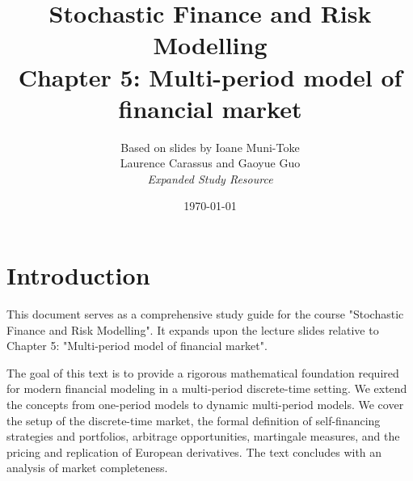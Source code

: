 \documentclass[12pt, a4paper]{report}
\title{\textbf{Stochastic Finance and Risk Modelling} \\ \large Chapter 5: Multi-period model of financial market}
\author{Based on slides by Ioane Muni-Toke \\ Laurence Carassus and Gaoyue Guo \\ \textit{Expanded Study Resource}}
\date{\today}
\theoremstyle{definition}
\begin{document}
\maketitle

\tableofcontents

\chapter*{Introduction}
This document serves as a comprehensive study guide for the course "Stochastic Finance and Risk Modelling". It expands upon the lecture slides relative to Chapter 5: "Multi-period model of financial market".

The goal of this text is to provide a rigorous mathematical foundation required for modern financial modeling in a multi-period discrete-time setting. We extend the concepts from one-period models to dynamic multi-period models. We cover the setup of the discrete-time market, the formal definition of self-financing strategies and portfolios, arbitrage opportunities, martingale measures, and the pricing and replication of European derivatives. The text concludes with an analysis of market completeness.





\end{document}
